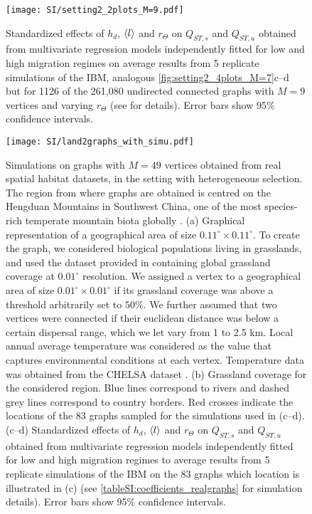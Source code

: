 \begin{figure}[t]
  \centerline{
      \texttt{[image: SI/setting2\_2plots\_M=9.pdf]} 
  }
  \caption{Standardized effects of $h_d$, $\langle l \rangle$ and $r_\Theta$ on $Q_{ST,s}$ and $Q_{ST,u}$ obtained from multivariate regression models independently fitted for low and high migration regimes on average results from 5 replicate simulations of the IBM, analogous \cref{fig:setting2_4plots_M=7}c--d but for 1126 of the 261,080 undirected connected graphs with $M=9$ vertices and varying $r_\Theta$ (see  for details). Error bars show 95\% confidence intervals.
}
  \label{figSI:setting2_2plots_M=9}
\end{figure}
\FloatBarrier

\begin{figure}[!ht]
  \centerline{
      \texttt{[image: SI/land2graphs\_with\_simu.pdf]} 
  }
  \caption{\small Simulations on graphs with $M=49$ vertices obtained from real spatial habitat datasets, in the setting with heterogeneous selection. The region from where graphs are obtained is centred on the Hengduan Mountains in Southwest China, one of the most species-rich temperate mountain biota globally \cite{Ding2020a}.
  (a) Graphical representation of a geographical area of size $ 0.11^{\circ} \times 0.11^{\circ}$. To create the graph, we considered biological populations living in grasslands, and used the dataset provided in \cite{Jung2020} containing global grassland coverage at $0.01^\circ$ resolution. We assigned a vertex to a geographical area of size $ 0.01^{\circ} \times 0.01^{\circ}$ if its grassland coverage was above a threshold arbitrarily set to $50\%$. We further assumed that two vertices were connected if their euclidean distance was below a certain dispersal range, which we let vary from 1 to 2.5 km. Local annual average temperature was considered as the value that captures environmental conditions at each vertex. Temperature data was obtained from the CHELSA dataset \cite{Karger2017}.
  (b) Grassland coverage for the considered region. Blue lines correspond to rivers and dashed grey lines correspond to country borders. Red crosses indicate the locations of the 83 graphs sampled for the simulations used in (c--d).
  (c--d) Standardized effects of $h_d$, $\langle l \rangle$ and $r_\Theta$ on $Q_{ST,s}$ and $Q_{ST,u}$ obtained from multivariate regression models independently fitted for low and high migration regimes to average results from 5 replicate simulations of the IBM on the 83 graphs which location is illustrated in (c) (see \cref{tableSI:coefficients_realgraphs} for simulation details). Error bars show 95\% confidence intervals.}
  \label{figSI:graph_real_land}
\end{figure}
\FloatBarrier


